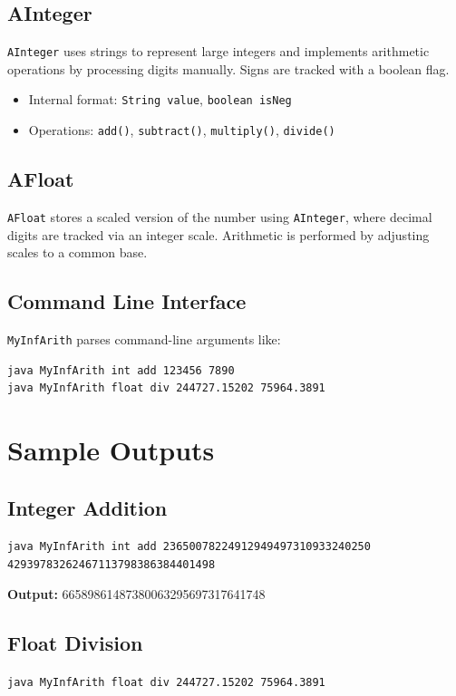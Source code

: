 \documentclass[11pt,a4paper]{article}
\begin{document}
\subsection{AInteger}
\texttt{AInteger} uses strings to represent large integers and implements arithmetic operations by processing digits manually. Signs are tracked with a boolean flag.

\begin{itemize}
    \item Internal format: \texttt{String value}, \texttt{boolean isNeg}
    \item Operations: \texttt{add()}, \texttt{subtract()}, \texttt{multiply()}, \texttt{divide()}
\end{itemize}

\subsection{AFloat}
\texttt{AFloat} stores a scaled version of the number using \texttt{AInteger}, where decimal digits are tracked via an integer scale. Arithmetic is performed by adjusting scales to a common base.

\subsection{Command Line Interface}
\texttt{MyInfArith} parses command-line arguments like:

\begin{verbatim}
java MyInfArith int add 123456 7890
java MyInfArith float div 244727.15202 75964.3891
\end{verbatim}

\section{Sample Outputs}

\subsection*{Integer Addition}
\texttt{java MyInfArith int add 23650078224912949497310933240250 42939783262467113798386384401498}

\textbf{Output:} 66589861487380063295697317641748

\subsection*{Float Division}
\texttt{java MyInfArith float div 244727.15202 75964.3891}
\end{document}

